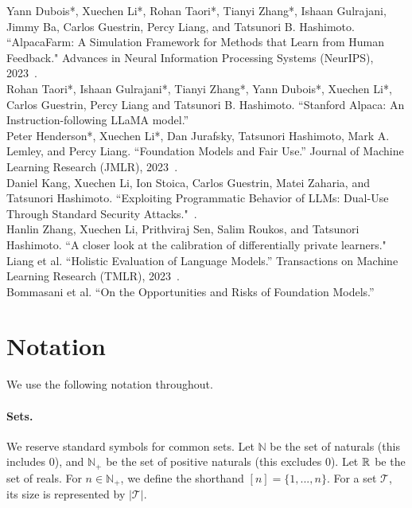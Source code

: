 \begin{verticalline}
Yann Dubois*, Xuechen Li*, Rohan Taori*, Tianyi Zhang*, Ishaan Gulrajani, Jimmy Ba, Carlos Guestrin, Percy Liang, and Tatsunori B. Hashimoto. ``AlpacaFarm: A Simulation Framework for Methods that Learn from Human Feedback."
Advances in Neural Information Processing Systems (NeurIPS), 2023~\cite{dubois2023alpacafarm}.\\

\noindent
Rohan Taori*, Ishaan Gulrajani*, Tianyi Zhang*, Yann Dubois*, Xuechen Li*, Carlos Guestrin, Percy Liang and Tatsunori B. Hashimoto.
``Stanford Alpaca: An Instruction-following LLaMA model.''~\cite{alpaca}\\

\noindent 
Peter Henderson*, Xuechen Li*, Dan Jurafsky, Tatsunori Hashimoto, Mark A. Lemley, and Percy Liang. 
``Foundation Models and Fair Use.''
Journal of Machine Learning Research (JMLR), 2023~\cite{henderson2023fairuse}.\\

\noindent 
Daniel Kang, Xuechen Li, Ion Stoica, Carlos Guestrin, Matei Zaharia, and Tatsunori Hashimoto. ``Exploiting Programmatic Behavior of LLMs: Dual-Use Through Standard Security Attacks."~\cite{kang2023exploiting}.\\

\noindent 
Hanlin Zhang, Xuechen Li, Prithviraj Sen, Salim Roukos, and Tatsunori Hashimoto. 
``A closer look at the calibration of differentially private learners."~\cite{zhang2022closer}\\

\noindent 
Liang et al.
``Holistic Evaluation of Language Models.''
Transactions on Machine Learning Research (TMLR), 2023~\cite{liang2023holistic}.\\


\noindent 
Bommasani et al.
``On the Opportunities and Risks of Foundation Models.''~\cite{bommasani2021opportunities}

\end{verticalline}

\newpage
\section{Notation}
We use the following notation throughout.

\paragraph{Sets.} 
We reserve standard symbols for common sets.
Let $\mathbb{N}$ be the set of naturals (this includes 0), and $\mathbb{N}_+$ be the set of positive naturals (this excludes 0).
Let $\mathbb{R}$ be the set of reals.
For $n \in \mathbb{N}_+$, we define the shorthand $[n] = \{1, . . . , n\}$.
For a set $\mathcal{T}$, its size is represented by $|\mathcal{T}|$.

